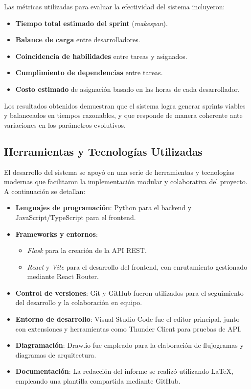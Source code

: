 Las métricas utilizadas para evaluar la efectividad del sistema incluyeron:

\begin{itemize}
    \item \textbf{Tiempo total estimado del sprint} (\textit{makespan}).
    \item \textbf{Balance de carga} entre desarrolladores.
    \item \textbf{Coincidencia de habilidades} entre tareas y asignados.
    \item \textbf{Cumplimiento de dependencias} entre tareas.
    \item \textbf{Costo estimado} de asignación basado en las horas de cada desarrollador.
\end{itemize}

Los resultados obtenidos demuestran que el sistema logra generar sprints viables y balanceados en tiempos razonables, y que responde de manera coherente ante variaciones en los parámetros evolutivos.

\subsection{Herramientas y Tecnologías Utilizadas}

El desarrollo del sistema se apoyó en una serie de herramientas y tecnologías modernas que facilitaron la implementación modular y colaborativa del proyecto. A continuación se detallan:

\begin{itemize}
    \item \textbf{Lenguajes de programación}: Python para el backend y JavaScript/TypeScript para el frontend.

    \item \textbf{Frameworks y entornos}:
          \begin{itemize}
              \item \textit{Flask} para la creación de la API REST.
              \item \textit{React} y \textit{Vite} para el desarrollo del frontend, con enrutamiento gestionado mediante React Router.
          \end{itemize}

    \item \textbf{Control de versiones}: Git y GitHub fueron utilizados para el seguimiento del desarrollo y la colaboración en equipo.

    \item \textbf{Entorno de desarrollo}: Visual Studio Code fue el editor principal, junto con extensiones y herramientas como Thunder Client para pruebas de API.

    \item \textbf{Diagramación}: Draw.io fue empleado para la elaboración de flujogramas y diagramas de arquitectura.

    \item \textbf{Documentación}: La redacción del informe se realizó utilizando LaTeX, empleando una plantilla compartida mediante GitHub.
\end{itemize}


